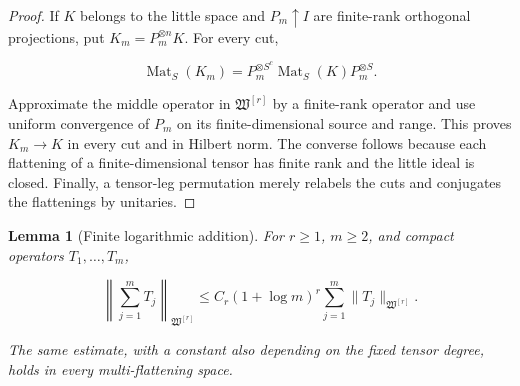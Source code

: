 \documentclass[10pt,reqno]{amsart}
\theoremstyle{plain}
\newtheorem{lemma}[theorem]{Lemma}
\theoremstyle{definition}
\theoremstyle{remark}
\begin{document}
\begin{proof}
If \(K\) belongs to the little space and \(P_m\uparrow I\) are finite-rank
orthogonal projections, put \(K_m=P_m^{\otimes n}K\).  For every cut,

\[
 \operatorname{Mat}_S(K_m)
 =P_m^{\otimes S^c}\operatorname{Mat}_S(K)P_m^{\otimes S}.
\]

Approximate the middle operator in \(\mathfrak W^{[r]}\) by a finite-rank
operator and use uniform convergence of \(P_m\) on its finite-dimensional
source and range.  This proves \(K_m\to K\) in every cut and in Hilbert
norm.  The converse follows because each flattening of a finite-dimensional
tensor has finite rank and the little ideal is closed.  Finally, a
tensor-leg permutation merely relabels the cuts and conjugates the
flattenings by unitaries.
\end{proof}

\begin{lemma}[Finite logarithmic addition]
\label{cc:gen-lemma-finite-addition}
For \(r\geq1\), \(m\geq2\), and compact operators \(T_1,\ldots,T_m\),

\begin{equation}
 \left\|\sum_{j=1}^mT_j\right\|_{\mathfrak W^{[r]}}
 \leq C_r(1+\log m)^r
 \sum_{j=1}^m\|T_j\|_{\mathfrak W^{[r]}}.
 \label{cc:gen-finite-addition}
\end{equation}

The same estimate, with a constant also depending on the fixed tensor
degree, holds in every multi-flattening space.
\end{lemma}
\end{document}
